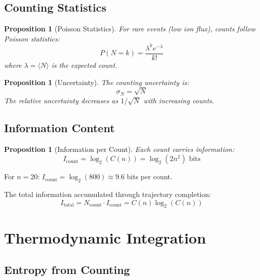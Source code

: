 \documentclass[twocolumn,10pt]{article}
\newtheorem{proposition}[theorem]{Proposition}
\begin{document}
\subsection{Counting Statistics}

\begin{proposition}[Poisson Statistics]
For rare events (low ion flux), counts follow Poisson statistics:
\begin{equation}
    P(N = k) = \frac{\lambda^k e^{-\lambda}}{k!}
\end{equation}
where $\lambda = \langle N \rangle$ is the expected count.
\end{proposition}

\begin{proposition}[Uncertainty]
The counting uncertainty is:
\begin{equation}
    \sigma_N = \sqrt{N}
\end{equation}
The relative uncertainty decreases as $1/\sqrt{N}$ with increasing counts.
\end{proposition}

\subsection{Information Content}

\begin{proposition}[Information per Count]
Each count carries information:
\begin{equation}
    I_{\text{count}} = \log_2(C(n)) = \log_2(2n^2) \text{ bits}
\end{equation}
\end{proposition}

For $n = 20$: $I_{\text{count}} = \log_2(800) \approx 9.6$ bits per count.

The total information accumulated through trajectory completion:
\begin{equation}
    I_{\text{total}} = N_{\text{count}} \cdot I_{\text{count}} = C(n) \log_2(C(n))
\end{equation}

\section{Thermodynamic Integration}
\label{sec:thermodynamics}

\subsection{Entropy from Counting}
\end{document}
